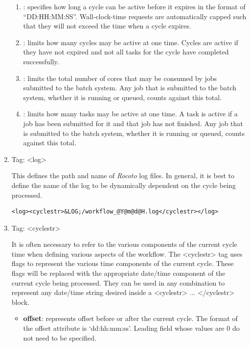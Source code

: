 \documentclass[11pt,fleqn]{report}              %
\begin{document}
\begin{enumerate}
\begin{enumerate}
\item {: specifies how long a cycle can be active before it expires in the format of ``DD:HH:MM:SS''. Wall-clock-time requests are automatically capped such that they will not exceed the time when a cycle expires. }

\item {: limits how many cycles may be active at one time. Cycles are active if they have not expired and not all tasks for the cycle have completed successfully. }

\item {: limits the total number of cores that may be consumed by jobs submitted to the batch system. Any job that is submitted to the batch system, whether it is running or queued, counts against this total.}

\item {: limits how many tasks may be active at one time. A task is active if a job has been submitted for it and that job has not finished. Any job that is submitted to the batch system, whether it is running or queued, counts against this total.}

\end{enumerate}


\item Tag: <log>

This defines the path and name of {\it Rocoto} log files. In general, it is best to define the name of the log to be dynamically dependent on the cycle being processed.

\lstset{language=XML}   
\begin{lstlisting}[frame=trBL]
<log><cyclestr>&LOG;/workflow_@Y@m@d@H.log</cyclestr></log>
\end{lstlisting}


\item Tag: <cyclestr>

It is often necessary to refer to the various components of the current cycle time when defining various aspects of the workflow. The <cyclestr> tag uses flags to represent the various time components of the current cycle. These flags will be replaced with the appropriate date/time component of the current cycle being processed. They can be used in any combination to represent any date/time string desired inside a <cyclestr> ... </cyclestr> block.

\begin{itemize}
\item {\bf offset}: represents offset before or after the current cycle. The format of the offset attribute is `dd:hh:mm:ss'. Leading field whose values are 0 do not need to be specified.
\end{itemize}


\end{enumerate}
\end{document}
